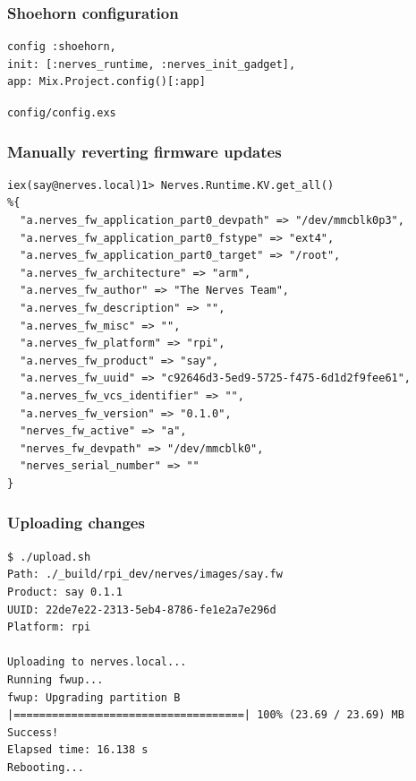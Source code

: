 \documentclass[10pt,xcolor=pdflatex,dvipsnames,table]{beamer}
\begin{document}
\begin{frame}[fragile]
  \frametitle{Shoehorn configuration}

  \begin{example}
    \begin{listing}[H]
      \begin{verbatim}
config :shoehorn,
init: [:nerves_runtime, :nerves_init_gadget],
app: Mix.Project.config()[:app]
      \end{verbatim}
      \caption{\texttt{config/config.exs}}
    \end{listing}
  \end{example}
\end{frame}

\begin{frame}[fragile]
  \frametitle{Manually reverting firmware updates}

  \begin{verbatim}
iex(say@nerves.local)1> Nerves.Runtime.KV.get_all()
%{
  "a.nerves_fw_application_part0_devpath" => "/dev/mmcblk0p3",
  "a.nerves_fw_application_part0_fstype" => "ext4",
  "a.nerves_fw_application_part0_target" => "/root",
  "a.nerves_fw_architecture" => "arm",
  "a.nerves_fw_author" => "The Nerves Team",
  "a.nerves_fw_description" => "",
  "a.nerves_fw_misc" => "",
  "a.nerves_fw_platform" => "rpi",
  "a.nerves_fw_product" => "say",
  "a.nerves_fw_uuid" => "c92646d3-5ed9-5725-f475-6d1d2f9fee61",
  "a.nerves_fw_vcs_identifier" => "",
  "a.nerves_fw_version" => "0.1.0",
  "nerves_fw_active" => "a",
  "nerves_fw_devpath" => "/dev/mmcblk0",
  "nerves_serial_number" => ""
}
  \end{verbatim}
\end{frame}

\begin{frame}[fragile]
  \frametitle{Uploading changes}

    \begin{verbatim}
$ ./upload.sh
Path: ./_build/rpi_dev/nerves/images/say.fw
Product: say 0.1.1
UUID: 22de7e22-2313-5eb4-8786-fe1e2a7e296d
Platform: rpi

Uploading to nerves.local...
Running fwup...
fwup: Upgrading partition B
|====================================| 100% (23.69 / 23.69) MB
Success!
Elapsed time: 16.138 s
Rebooting...
  \end{verbatim}
\end{frame}
\end{document}
